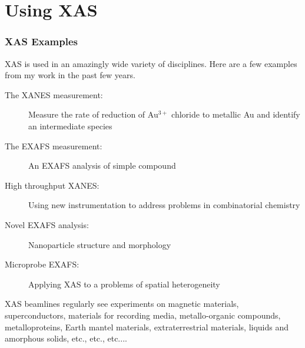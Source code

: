 \documentclass[10pt, xcolor=x11names, compress, handout]{beamer}
\begin{document}
\section[Using XAS]{Using XAS}

\begin{frame}
  \frametitle{XAS Examples}

  XAS is used in an amazingly wide variety of disciplines.  Here are
  a few examples from my work in the past few years.

  \bigskip

  \begin{description}
  \item[The XANES measurement:] Measure the rate of reduction of Au$^{3+}$
    chloride to metallic Au and identify an intermediate species
  \item[The EXAFS measurement:] An EXAFS analysis of simple compound
  \item[High throughput XANES:] Using new instrumentation to address
    problems in combinatorial chemistry
  \item[Novel EXAFS analysis:] Nanoparticle structure
    and morphology
  \item[Microprobe EXAFS:] Applying XAS to a problems of spatial
    heterogeneity
  \end{description}

  \bigskip

  XAS beamlines regularly see experiments on magnetic materials,
  {\small superconductors}, {\footnotesize materials for recording
    media}, {\scriptsize metallo-organic compounds}, {\tiny
    metalloproteins, {\color{SlateGray4}Earth mantel materials},
    {\color{SlateGray3}extraterrestrial materials},
    {\color{SlateGray2}liquids and amorphous solids},
    {\color{SlateGray1}etc., etc., etc....}}
\end{frame}
\end{document}
